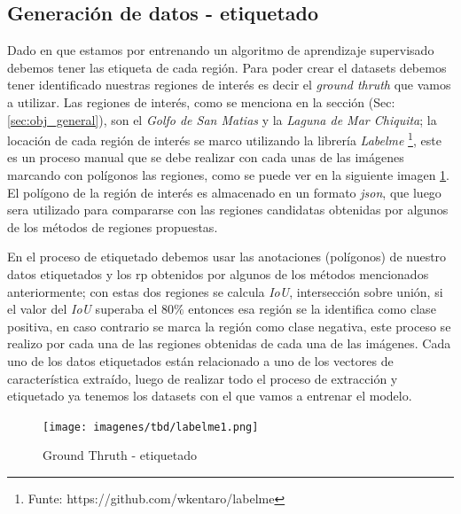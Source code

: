 \subsection{Generación de datos - etiquetado}\label{sub:generacion_datos_etiquetado}

Dado en que estamos por entrenando un algoritmo de aprendizaje supervisado debemos tener las etiqueta de cada región. Para poder crear el datasets debemos tener identificado nuestras regiones de interés es decir el \textit{ground thruth} que vamos a utilizar. Las regiones de interés, como se menciona en la sección (Sec:\ref{sec:obj_general}), son el \textit{Golfo de San Matias} y la \textit{Laguna de Mar Chiquita}; la locación de cada región de interés se marco utilizando la librería \textit{Labelme} \footnote{Funte: https://github.com/wkentaro/labelme}, este es un proceso manual que se debe realizar con cada unas de las imágenes marcando con polígonos las regiones, como se puede ver en la siguiente imagen \ref{Fig:labelme-etiquetado}. El polígono de la región de interés es almacenado en un formato \textit{json}, que luego sera utilizado para compararse con las regiones candidatas obtenidas por algunos de los métodos de regiones propuestas. 


En el proceso de etiquetado debemos usar las anotaciones (polígonos) de nuestro datos etiquetados y los \ac{rp} obtenidos por algunos de los métodos mencionados anteriormente; con estas dos regiones se calcula \textit{IoU}, intersección sobre unión, si el valor del \textit{IoU} superaba el $80\%$ entonces esa región se la identifica como clase positiva, en caso contrario se marca la región como clase negativa, este proceso se realizo por cada una de las regiones obtenidas de cada una de las imágenes. Cada uno de los datos etiquetados están relacionado a uno de los vectores de característica extraído, luego de realizar todo el proceso de extracción y etiquetado ya tenemos los datasets con el que vamos a entrenar el modelo.

\begin{figure}[H] \centering
  \texttt{[image: imagenes/tbd/labelme1.png]}
  \caption{Ground Thruth - etiquetado}\label{Fig:labelme-etiquetado}
\end{figure}

